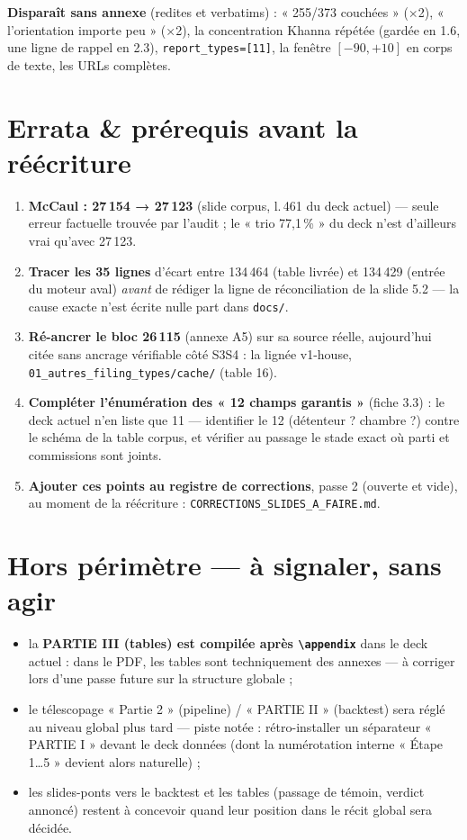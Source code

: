 \documentclass[11pt,a4paper]{article}
\newcommand{\co}[1]{\texttt{#1}}
\begin{document}
\noindent\textbf{Disparaît sans annexe} (redites et verbatims) : « 255/373 couchées » (×2),
« l'orientation importe peu » (×2), la concentration Khanna répétée (gardée en 1.6, une
ligne de rappel en 2.3), \co{report\_types=[11]}, la fenêtre $[-90, +10]$ en corps de
texte, les URLs complètes.

\section{Errata \& prérequis avant la réécriture}
\label{sec:errata}

\begin{enumerate}[itemsep=1pt, topsep=2pt]
  \item \textbf{McCaul : 27\,154 → 27\,123} (slide corpus, l.\,461 du deck actuel) ---
        seule erreur factuelle trouvée par l'audit ; le « trio 77,1\,\% » du deck n'est
        d'ailleurs vrai qu'avec 27\,123.
  \item \textbf{Tracer les 35 lignes} d'écart entre 134\,464 (table livrée) et 134\,429
        (entrée du moteur aval) \emph{avant} de rédiger la ligne de réconciliation de la
        slide 5.2 --- la cause exacte n'est écrite nulle part dans \co{docs/}.
  \item \textbf{Ré-ancrer le bloc 26\,115} (annexe A5) sur sa source réelle, aujourd'hui
        citée sans ancrage vérifiable côté S3S4 : la lignée v1-house,
        \co{01\_autres\_filing\_types/cache/} (table 16).
  \item \textbf{Compléter l'énumération des « 12 champs garantis »} (fiche 3.3) : le deck
        actuel n'en liste que 11 --- identifier le 12\ieme{} (détenteur ? chambre ?) contre
        le schéma de la table corpus, et vérifier au passage le stade exact où parti et
        commissions sont joints.
  \item \textbf{Ajouter ces points au registre de corrections}, passe 2 (ouverte et
        vide), au moment de la réécriture : \co{CORRECTIONS\_SLIDES\_A\_FAIRE.md}.
\end{enumerate}

\section{Hors périmètre --- à signaler, sans agir}

\begin{itemize}[itemsep=1pt, topsep=2pt]
  \item la \textbf{PARTIE III (tables) est compilée après \co{\textbackslash appendix}}
        dans le deck actuel : dans le PDF, les tables sont techniquement des annexes ---
        à corriger lors d'une passe future sur la structure globale ;
  \item le télescopage « Partie 2 » (pipeline) / « PARTIE II » (backtest) sera réglé au
        niveau global plus tard --- piste notée : rétro-installer un séparateur
        « PARTIE I » devant le deck données (dont la numérotation interne « Étape 1…5 »
        devient alors naturelle) ;
  \item les slides-ponts vers le backtest et les tables (passage de témoin, verdict
        annoncé) restent à concevoir quand leur position dans le récit global sera
        décidée.
\end{itemize}
\end{document}

